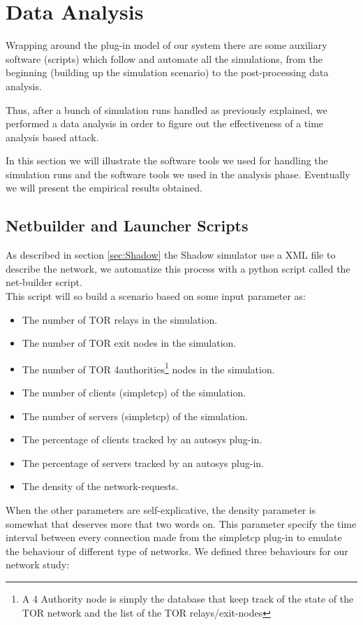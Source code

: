 \section{Data Analysis}
Wrapping around the plug-in model of our system there are some auxiliary
software (scripts)
which follow and automate all the simulations, from the beginning (building up
the simulation scenario) to the post-processing data analysis.

Thus, after a bunch of simulation runs handled as previously explained,
 we performed a data analysis in order to
figure out the effectiveness of a time analysis based attack.  

In this section we will illustrate the software tools we used for
handling the
simulation runs and the software tools we used in the analysis phase. 
Eventually we will 
present the empirical results
obtained.
\subsection{Netbuilder and Launcher Scripts}
As described in section \ref{sec:Shadow}
the Shadow simulator use a XML file to describe the network,
we automatize this process with a python script called the net-builder script.\\
This script will so build a scenario based on some input parameter as:
\begin{itemize}
\item The number of TOR relays in the simulation.
\item The number of TOR exit nodes in the simulation.
\item The number of TOR 4authorities\footnote{A 4 Authority node is simply the
database that keep track of the state of the TOR network and the list
of the TOR relays/exit-nodes} nodes in the simulation.
\item The number of clients (simpletcp) of the simulation.
\item The number of servers (simpletcp) of the simulation.
\item The percentage of clients tracked by an autosys plug-in.
\item The percentage of servers tracked by an autosys plug-in.
\item The density of the network-requests.
\end{itemize}

When the other parameters are self-explicative, the density parameter is somewhat
that deserves more that two words on.
This parameter specify the time interval between every connection made from the
simpletcp plug-in to emulate the behaviour of different type of networks.
We defined three behaviours for our network study:

